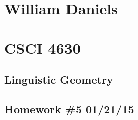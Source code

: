 \documentclass[11pt]{article}
\begin{document}
\begin{center}
\section*{William Daniels}
\section*{CSCI 4630}
\subsection*{Linguistic Geometry}
\subsection*{Homework \#5 01/21/15}
\end{center}

\vspace{.25cm}
\end{document}
